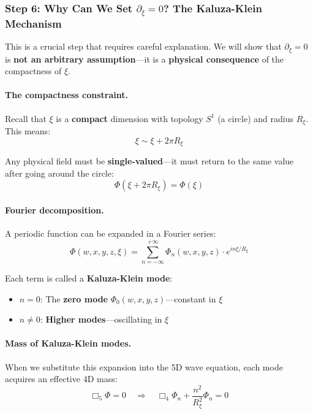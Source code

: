 \subsubsection{Step 6: Why Can We Set $\partial_\xi = 0$? The Kaluza-Klein Mechanism}

This is a crucial step that requires careful explanation. We will show that $\partial_\xi = 0$ is \textbf{not an arbitrary assumption}---it is a \textbf{physical consequence} of the compactness of $\xi$.

\paragraph{The compactness constraint.}

Recall that $\xi$ is a \textbf{compact} dimension with topology $S^1$ (a circle) and radius $R_\xi$. This means:
\begin{equation}
\xi \sim \xi + 2\pi R_\xi
\end{equation}

Any physical field must be \textbf{single-valued}---it must return to the same value after going around the circle:
\begin{equation}
\Phi(\xi + 2\pi R_\xi) = \Phi(\xi)
\end{equation}

\paragraph{Fourier decomposition.}

A periodic function can be expanded in a Fourier series:
\begin{equation}
\Phi(w, x, y, z, \xi) = \sum_{n=-\infty}^{+\infty} \Phi_n(w, x, y, z) \cdot e^{in\xi/R_\xi}
\end{equation}

Each term is called a \textbf{Kaluza-Klein mode}:
\begin{itemize}
    \item $n = 0$: The \textbf{zero mode} $\Phi_0(w, x, y, z)$---constant in $\xi$
    \item $n \neq 0$: \textbf{Higher modes}---oscillating in $\xi$
\end{itemize}

\paragraph{Mass of Kaluza-Klein modes.}

When we substitute this expansion into the 5D wave equation, each mode acquires an effective 4D mass:
\begin{equation}
\Box_5 \Phi = 0 \quad \Rightarrow \quad \Box_4 \Phi_n + \frac{n^2}{R_\xi^2}\Phi_n = 0
\end{equation}

